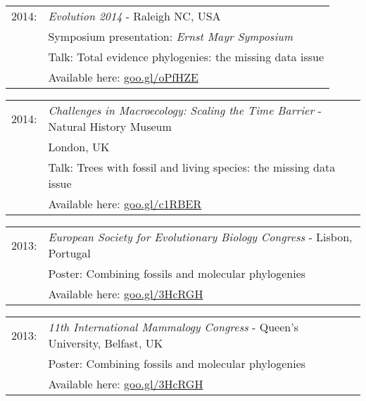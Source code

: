 \documentclass[10pt,a4paper]{article}
\begin{document}
{\begin{tabular}{ll}
\end{tabular}
\begin{tabular}{ll}
2014: & \textit{Evolution 2014} - Raleigh NC, USA\\
      & Symposium presentation: \textit{Ernst Mayr Symposium} \\
      & Talk: Total evidence phylogenies: the missing data issue\\
      & Available here: \href{http://figshare.com/articles/Total_evidence_phylogenies_the_missing_data_issue/1086216}{goo.gl/oPfHZE}\\
\end{tabular}
\begin{tabular}{ll}
2014: & \textit{Challenges in Macroecology: Scaling the Time Barrier} - Natural History Museum \\
      & London, UK\\
      & Talk: Trees with fossil and living species: the missing data issue\\
      & Available here: \href{http://figshare.com/articles/Trees_with_fossil_and_living_species_the_data_issue/1056307}{goo.gl/c1RBER}\\
\end{tabular}
\begin{tabular}{ll}
2013: & \textit{European Society for Evolutionary Biology Congress} - Lisbon, Portugal\\
      & Poster: Combining fossils and molecular phylogenies\\
      & Available here: \href{http://figshare.com/articles/Combining_fossils_and_molecular_phylogenies/1056300}{goo.gl/3HcRGH}\\
\end{tabular}
\begin{tabular}{ll}
2013: & \textit{11th International Mammalogy Congress} - Queen's University, Belfast, UK \\
      & Poster: Combining fossils and molecular phylogenies\\
      & Available here: \href{http://figshare.com/articles/Combining_fossils_and_molecular_phylogenies/1056300}{goo.gl/3HcRGH}\\
\end{tabular}
\bigskip

}
\end{document}
